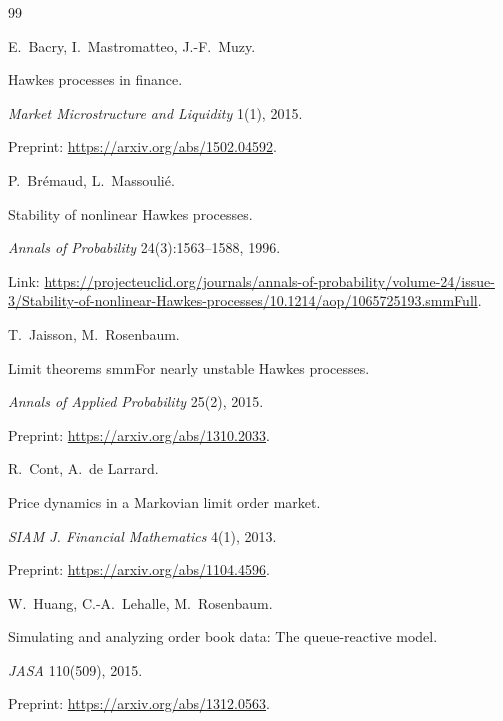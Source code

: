 \documentclass[11pt]{article}
\newcommand{\1}{\mathbbm{1}}
\begin{document}
\begin{thebibliography}{99}\setlength{\itemsep}{2pt}




E.~Bacry, I.~Mastromatteo, J.-F.~Muzy.

Hawkes processes in finance.

\emph{Market Microstructure and Liquidity} 1(1), 2015.

Preprint: \url{https://arxiv.org/abs/1502.04592}.




P.~Br\'{e}maud, L.~Massouli\'{e}.

Stability of nonlinear Hawkes processes.

\emph{Annals of Probability} 24(3):1563--1588, 1996.

Link: \url{https://projecteuclid.org/journals/annals-of-probability/volume-24/issue-3/Stability-of-nonlinear-Hawkes-processes/10.1214/aop/1065725193.smmFull}.




T.~Jaisson, M.~Rosenbaum.

Limit theorems smmFor nearly unstable Hawkes processes.

\emph{Annals of Applied Probability} 25(2), 2015.

Preprint: \url{https://arxiv.org/abs/1310.2033}.




R.~Cont, A.~de Larrard.

Price dynamics in a Markovian limit order market.

\emph{SIAM J. Financial Mathematics} 4(1), 2013.

Preprint: \url{https://arxiv.org/abs/1104.4596}.




W.~Huang, C.-A.~Lehalle, M.~Rosenbaum.

Simulating and analyzing order book data: The queue-reactive model.

\emph{JASA} 110(509), 2015.

Preprint: \url{https://arxiv.org/abs/1312.0563}.





\end{thebibliography}
\end{document}
